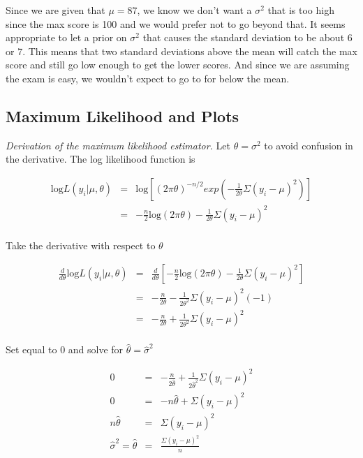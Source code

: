 \documentclass[12pt]{article}
\begin{document}
\noindent Since we are given that $\mu=87$, we know we don't want a $\sigma^2$ that is too high since the max score is 100 and we would prefer not to go beyond that.  It seems appropriate to let a prior on $\sigma^2$ that causes the standard deviation to be about 6 or 7.  This means that two standard deviations above the mean will catch the max score and still go low enough to get the lower scores.  And since we are assuming the exam is easy, we wouldn't expect to go to for below the mean.

\subsection{Maximum Likelihood and Plots}

\noindent \emph{Derivation of the maximum likelihood estimator.}  Let $\theta=\sigma^2$ to avoid confusion in the derivative.  The log likelihood function is

\begin{eqnarray*}
\mathrm{log}L(y_i|\mu,\theta) &=& \mathrm{log}\left[(2\pi\theta)^{-n/2}exp\left(-\frac{1}{2\theta}\Sigma(y_i-\mu)^2\right)\right] \\
&=& -\frac{n}{2}\mathrm{log}(2\pi\theta)-\frac{1}{2\theta}\Sigma(y_i-\mu)^2 \\
\end{eqnarray*}

\noindent Take the derivative with respect to $\theta$

\begin{eqnarray*}
\frac{d}{d\theta}\mathrm{log}L(y_i|\mu,\theta) &=& \frac{d}{d\theta}\left[-\frac{n}{2}\mathrm{log}(2\pi\theta)-\frac{1}{2\theta}\Sigma(y_i-\mu)^2\right] \\
&=& -\frac{n}{2\theta}-\frac{1}{2\theta^2}\Sigma(y_i-\mu)^2(-1) \\
&=& -\frac{n}{2\theta}+\frac{1}{2\theta^2}\Sigma(y_i-\mu)^2 \\
\end{eqnarray*}

\noindent Set equal to 0 and solve for $\hat{\theta}=\hat{\sigma}^2$

\begin{eqnarray*}
0 &=& -\frac{n}{2\hat{\theta}}+\frac{1}{2\hat{\theta}^2}\Sigma(y_i-\mu)^2 \\
0 &=& -n\hat{\theta}+\Sigma(y_i-\mu)^2 \\
n\hat{\theta} &=& \Sigma(y_i-\mu)^2 \\
\hat{\sigma}^2=\hat{\theta} &=& \frac{\Sigma(y_i-\mu)^2}{n} \\
\end{eqnarray*}
\end{document}
